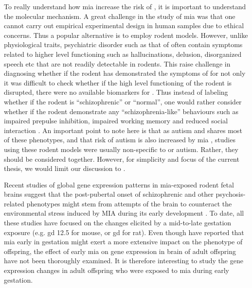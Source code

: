 To really understand how \gls{mia} increase the risk of , it is important to understand the molecular mechanism.
A great challenge in the study of \gls{mia} was that one cannot carry out empirical experimental design in human samples due to ethical concerns.
Thus a popular alternative is to employ rodent models.
However, unlike physiological traits, psychiatric disorder such as that of  often contain symptoms related to higher level functioning such as hallucinations, delusion, disorganized speech etc \citep{AmericanPsychiatricAssociation2013} that are not readily detectable in rodents.
This raise challenge in diagnosing whether if the rodent has demonstrated the symptoms of  for not only it was difficult to check whether if the high level functioning of the rodent is disrupted, there were no available biomarkers for .
Thus instead of labeling whether if the rodent is ``schizophrenic'' or ``normal'', one would rather consider whether if the rodent demonstrate any ``schizophrenia-like'' behaviours such as impaired prepulse inhibition, impaired working memory and reduced social interaction \citep{Meyer2007a}.
An important point to note here is that as autism and  shares most of these phenotypes, and that risk of autism is also increased by \gls{mia} \citep{Brown2012}, studies using these rodent models were usually non-specific to  or autism. 
Rather, they should be considered together. 
However, for simplicity and focus of the current thesis, we would limit our discussion to .

Recent studies of global gene expression patterns in \gls{mia}-exposed rodent fetal brains \citep{Oskvig2012,Garbett2012a} suggest that the post-pubertal onset of schizophrenic and other psychosis-related phenotypes might stem from attempts of the brain to counteract the environmental stress induced by MIA during its early development \citep{Garbett2012a}. 
To date, all these studies have focused on the changes elicited by a mid-to-late gestation exposure (e.g. \gls{gd} 12.5 for mouse, or \gls{gd} for rat). 
Even though \citet{Meyer2007a,Li2009c,Li2010a} have reported that \gls{mia} early in gestation might exert a more extensive impact on the phenotype of offspring, the effect of early \gls{mia} on gene expression in brain of adult offspring have not been thoroughly examined.
It is therefore interesting to study the gene expression changes in adult offspring who were exposed to \gls{mia} during early gestation.

